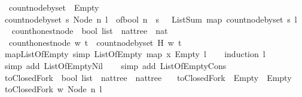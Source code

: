 \begin{isabellebody}
\ \ {\isachardoublequoteopen}count{\isacharunderscore}node{\isacharunderscore}by{\isacharunderscore}set\ {\isacharunderscore}\ Empty\ {\isacharequal}\ {}{\isachardoublequoteclose}\isanewline
{\isacharbar}\ {\isachardoublequoteopen}count{\isacharunderscore}node{\isacharunderscore}by{\isacharunderscore}set\ s\ {\isacharparenleft}Node\ n\ l{\isacharparenright}\ {\isacharequal}\ {\isacharparenleft}of{\isacharunderscore}bool\ {\isacharparenleft}n\ {\isasymin}\ s{\isacharparenright}{\isacharparenright}\ {\isacharplus}\ \ ListSum\ {\isacharparenleft}map\ {\isacharparenleft}count{\isacharunderscore}node{\isacharunderscore}by{\isacharunderscore}set\ s{\isacharparenright}\ l{\isacharparenright}{\isachardoublequoteclose}\ \ \isanewline
\isanewline
{}\isamarkupfalse%
\ count{\isacharunderscore}honest{\isacharunderscore}node\ {\isacharcolon}{\isacharcolon}\ {\isachardoublequoteopen}bool\ list\ {\isasymRightarrow}\ nattree\ {\isasymRightarrow}\ nat{\isachardoublequoteclose}\ \isanewline
\ \ {\isachardoublequoteopen}count{\isacharunderscore}honest{\isacharunderscore}node\ w\ t\ {\isacharequal}\ count{\isacharunderscore}node{\isacharunderscore}by{\isacharunderscore}set\ {\isacharparenleft}H\ w{\isacharparenright}\ t{\isachardoublequoteclose}\isanewline
\isanewline
{}\isamarkupfalse%
\ map{\isacharunderscore}ListOfEmpty\ {\isacharbrackleft}simp{\isacharbrackright}{\isacharcolon}\ {\isachardoublequoteopen}ListOfEmpty\ {\isacharparenleft}map\ {\isacharparenleft}{\isasymlambda}x{\isachardot}\ Empty{\isacharparenright}\ l{\isacharparenright}{\isachardoublequoteclose}\isanewline
%
\isadelimproof
\ \ %
\endisadelimproof
%
\isatagproof
{}\isamarkupfalse%
\ {\isacharparenleft}induction\ l{\isacharparenright}\isanewline
\ \ \isamarkupfalse%
\ {\isacharparenleft}simp\ add{\isacharcolon}\ ListOfEmpty{\isachardot}Nil{\isacharparenright}\isanewline
\ \ \isamarkupfalse%
\ {\isacharparenleft}simp\ add{\isacharcolon}\ ListOfEmpty{\isachardot}Cons{\isacharparenright}%
\endisatagproof
{\isafoldproof}%
%
\isadelimproof
\isanewline
%
\endisadelimproof
\ \ \isanewline
\isanewline
{}\isamarkupfalse%
\ toClosedFork\ {\isacharcolon}{\isacharcolon}\ {\isachardoublequoteopen}bool\ list\ {\isasymRightarrow}\ nattree\ {\isasymRightarrow}\ nattree{\isachardoublequoteclose}\ \isanewline
\ \ {\isachardoublequoteopen}toClosedFork\ {\isacharunderscore}\ Empty\ {\isacharequal}\ Empty{\isachardoublequoteclose}\isanewline
{\isacharbar}\ {\isachardoublequoteopen}toClosedFork\ w\ {\isacharparenleft}Node\ n\ l{\isacharparenright}\ {\isacharequal}\isanewline

\end{isabellebody}
